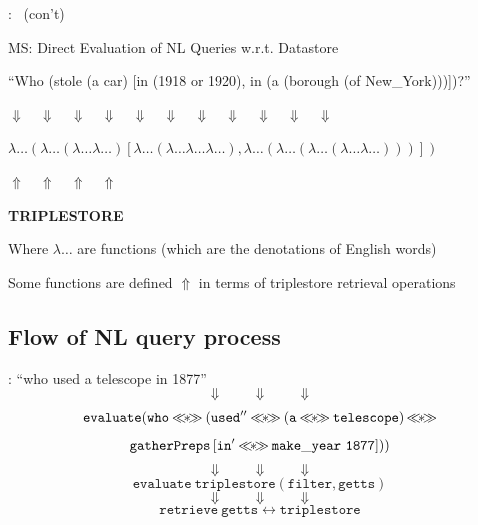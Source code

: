 \documentclass[logoontitle,tabu,supertabular,aspectratio=43]{preney-uwindsor-beamer}
\begin{document}
    \begin{frame}{\insertsection: \insertsubsection\ (con't)}
        \centering

        MS: Direct Evaluation of NL Queries w.r.t. Datastore

        {
            \color{orange}
            ``Who (stole (a car) [in (1918 or 1920), in (a (borough (of New\_York)))])?''
        }

        $\Downarrow\quad\Downarrow\quad\Downarrow\quad\Downarrow\quad\Downarrow\quad\Downarrow\quad\Downarrow\quad\Downarrow\quad\Downarrow\quad\Downarrow\quad\Downarrow$

        {\small$\lambda\ldots ( \lambda\ldots ( \lambda\ldots \lambda\ldots) [\lambda\ldots (\lambda\ldots \lambda\ldots \lambda\ldots), \lambda \ldots(\lambda\ldots(\lambda\ldots ( \lambda\ldots \lambda\ldots)))])$}

        $\Uparrow\quad\Uparrow\quad\Uparrow\quad\Uparrow$

        \textbf{TRIPLESTORE}

        Where $\lambda\ldots$ are functions (which are the denotations of English words)

        {
            \color{red}
            Some functions are defined
        }
        $\Uparrow$
        {
            \color{red}
            in terms of triplestore retrieval operations
        }
    \end{frame}

    \subsection{Flow of NL query process}
    \begin{frame}{\insertsection: \insertsubsection}
        \small
        \centering
        ``who used a telescope in 1877''
        \[\Downarrow \qquad \Downarrow \qquad \Downarrow \]
        \[ \mathtt{evaluate} ( \mathtt{who} \biapply (\mathtt{used''} \biapply \left(\mathtt{a} \biapply \mathtt{telescope}\right) \biapply \]
        \[ \mathtt{gatherPreps} \left[ \mathtt{in'} \mathbin{\ll\mkern-8mu*\mkern-8mu\gg} \mathtt{make\_year}\ \mathtt{1877}\right] ))  \]
        \[\Downarrow \qquad \Downarrow \qquad \Downarrow \]
        \[\mathtt{evaluate}\ \mathtt{triplestore} \left(\mathtt{filter},\mathtt{getts}\right) \]
        \[\Downarrow \qquad \Downarrow \qquad \Downarrow \]
        \[\mathtt{retrieve}\ \mathtt{getts} \longleftrightarrow \mathtt{triplestore} \]

    \end{frame}
\end{document}
